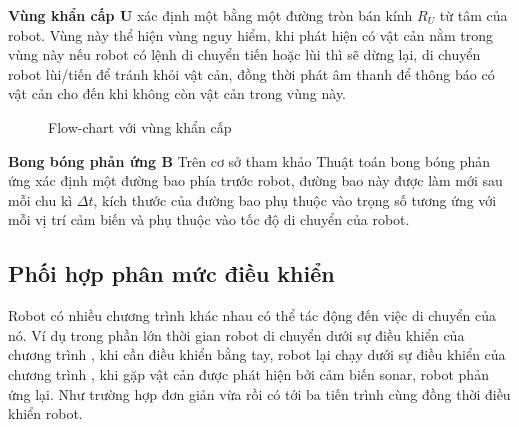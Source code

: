 \textbf{Vùng khẩn cấp U} xác định một bằng một đường tròn bán kính ${R}_{U}$ từ tâm của robot. Vùng này thể hiện vùng nguy hiểm, khi phát hiện có vật cản nằm trong vùng này nếu robot có lệnh di chuyển tiến hoặc lùi thì sẽ dừng lại, di chuyển robot lùi/tiến để tránh khỏi vật cản, đồng thời phát âm thanh để thông báo có vật cản cho đến khi không còn vật cản trong vùng này.
\begin{figure}[]
    \centering
    \caption{Flow-chart với vùng khẩn cấp}
    \label{flowchart-urgent}
\end{figure}

\textbf{Bong bóng phản ứng B} 
Trên cơ sở tham khảo \cite{Susnea2009} Thuật toán bong bóng phản ứng xác định một đường bao phía trước robot, đường bao này được làm mới sau mỗi chu kì ${\Delta}{t}$, kích thước của đường bao phụ thuộc vào trọng số tương ứng với mỗi vị trí cảm biến và phụ thuộc vào tốc độ di chuyển của robot.


\subsection{Phối hợp phân mức điều khiển}
Robot có nhiều chương trình khác nhau có thể tác động đến việc di chuyển của nó. Ví dụ trong phần lớn thời gian robot di chuyển dưới sự điều khiển của chương trình , khi cần điều khiển bằng tay, robot lại chạy dưới sự điều khiển của chương trình , khi gặp vật cản được phát hiện bởi cảm biến sonar, robot phản ứng lại. Như trường hợp đơn giản vừa rồi có tới ba tiến trình cùng đồng thời điều khiển robot. 

